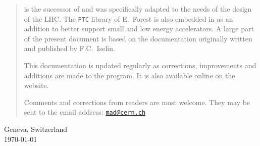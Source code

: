 \begin{titlepage}
\begin{quotation}
\madx is the successor of \madeight and was specifically adapted to the 
needs of the design of the LHC.
The \texttt{PTC} library of E.~Forest is also embedded in \madx as an 
addition to better support small and low energy accelerators.
%
%
%
%
A large part of the present document is based on the \madeight 
documentation originally written and published by F.C.~Iselin.  

This documentation is updated regularly as corrections, improvements
and additions are made to the program. 
It is also available online on the \href{http://cern.ch/madx}{\madx} website.

Comments and corrections from readers are most welcome.
They may be sent to the email address:
\href{mailto:mad@cern.ch?subject=[user's guide]}{\texttt{mad@cern.ch}}
\end{quotation}
\vfill

\begin{center}
Geneva, Switzerland \\
\today
\end{center}

\end{titlepage}
